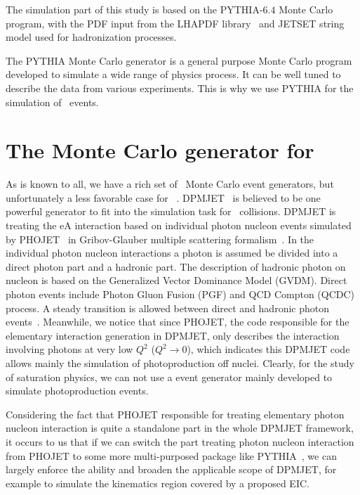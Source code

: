 The simulation part of this study is based on the PYTHIA-$6.4$ Monte Carlo program,
with the PDF input from the LHAPDF library~\cite{Whalley:2005nh} and JETSET string model used for
hadronization processes. 


The PYTHIA Monte Carlo generator is a general purpose Monte Carlo program developed to simulate a wide range of physics process. It can be well tuned to describe the data from various experiments. This is why we use PYTHIA for the simulation of \ep\ events.


\section{The Monte Carlo generator for \eA\ }

As is known to all, we have a rich set of \ep\ Monte Carlo event generators, but
unfortunately a less favorable case for \eA~\cite{Boer:2011fh}.
DPMJET~\cite{Roesler:2000he} is believed to be one powerful generator to fit
into the simulation task for \eA\ collisions. DPMJET is treating the eA
interaction based on individual photon nucleon events simulated by
PHOJET~\cite{Engel:1994vs} in Gribov-Glauber multiple scattering
formalism~\cite{Engel:1996yb}. In the individual photon nucleon interactions a
photon is assumed be divided into a direct photon part and a hadronic part. The
description of hadronic photon on nucleon is based on the Generalized Vector
Dominance Model (GVDM). Direct photon events include Photon Gluon Fusion (PGF)
and QCD Compton (QCDC) process. A steady transition is allowed between direct
and hadronic photon events~\cite{Roesler:1998wy}. Meanwhile, we notice that
since PHOJET, the code responsible for the elementary interaction generation in
DPMJET, only describes the interaction involving photons at very low $Q^2$ ($Q^{2}\rightarrow 0$), which indicates 
this DPMJET code allows mainly the simulation of
photoproduction off nuclei. Clearly, for the study of saturation physics, we can not use a event generator
mainly developed to simulate photoproduction events. 

Considering the fact that PHOJET responsible for treating elementary photon
nucleon interaction is quite a standalone part in the whole DPMJET framework, it
occurs to us that if we can switch the part treating photon nucleon interaction
from PHOJET to some more multi-purposed package like
PYTHIA~\cite{Sjostrand:2006za}, we can largely enforce the ability and broaden
the applicable scope of DPMJET, for example to simulate the kinematics region
covered by a proposed EIC.

